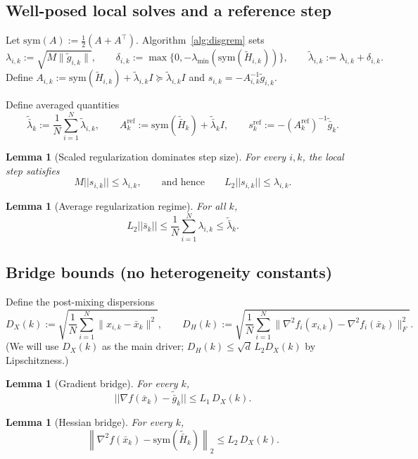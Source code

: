 \documentclass[11pt,a4paper]{article}
\def\norm#1{||#1||}%
\newtheorem{lemma}[theorem]{Lemma}
\newcommand{\norm}[1]{\left\|#1\right\|}
\newcommand{\normtwo}[1]{\left\|#1\right\|_2}
\begin{document}
\subsection{Well-posed local solves and a reference step}
Let $\mathrm{sym}(A):=\tfrac12(A+A^\top)$.
Algorithm~\ref{alg:disgrem} sets
\[
\lambda_{i,k}:=\sqrt{M\|\tilde g_{i,k}\|},
\qquad
\delta_{i,k}:=\max\{0,-\lambda_{\min}(\mathrm{sym}(\tilde H_{i,k}))\},
\qquad
\tilde\lambda_{i,k}:=\lambda_{i,k}+\delta_{i,k}.
\]
Define $A_{i,k}:=\mathrm{sym}(\tilde H_{i,k})+\tilde\lambda_{i,k}I\succeq \tilde\lambda_{i,k}I$ and
$s_{i,k}=-A_{i,k}^{-1}\tilde g_{i,k}$.

Define averaged quantities
\[
\tilde{\bar\lambda}_k:=\frac1N\sum_{i=1}^N\tilde\lambda_{i,k},
\qquad
A_k^{\mathrm{ref}}:=\mathrm{sym}(\tilde{\bar H}_k)+\tilde{\bar\lambda}_k I,
\qquad
s_k^{\mathrm{ref}}:=-(A_k^{\mathrm{ref}})^{-1}\tilde{\bar g}_k.
\]

\begin{lemma}[Scaled regularization dominates step size]\label{lem:M-vs-s}
	For every $i,k$, the local step satisfies
	\[
	M\norm{s_{i,k}}\le \lambda_{i,k},
	\qquad\text{and hence}\qquad
	L_2\norm{s_{i,k}}\le \lambda_{i,k}.
	\]
\end{lemma}

\begin{lemma}[Average regularization regime]\label{lem:avg-regime}
	For all $k$,
	\[
	L_2\norm{\bar s_k}\le \frac1N\sum_{i=1}^N \lambda_{i,k}\le \tilde{\bar\lambda}_k.
	\]
\end{lemma}

\subsection{Bridge bounds (no heterogeneity constants)}
Define the post-mixing dispersions
\[
D_X(k):=\sqrt{\frac1N\sum_{i=1}^N \|x_{i,k}-\bar x_k\|^2},
\qquad
D_H(k):=\sqrt{\frac1N\sum_{i=1}^N \|\nabla^2 f_i(x_{i,k})-\nabla^2 f_i(\bar x_k)\|_F^2}.
\]
(We will use $D_X(k)$ as the main driver; $D_H(k)\le \sqrt d\,L_2 D_X(k)$ by Lipschitzness.)

\begin{lemma}[Gradient bridge]\label{lem:bridge-grad}
	For every $k$,
	\[
	\norm{\nabla f(\bar x_k)-\tilde{\bar g}_k}\le L_1\,D_X(k).
	\]
\end{lemma}

\begin{lemma}[Hessian bridge]\label{lem:bridge-hess}
	For every $k$,
	\[
	\normtwo{\nabla^2 f(\bar x_k)-\mathrm{sym}(\tilde{\bar H}_k)}\le L_2\,D_X(k).
	\]
\end{lemma}
\end{document}
